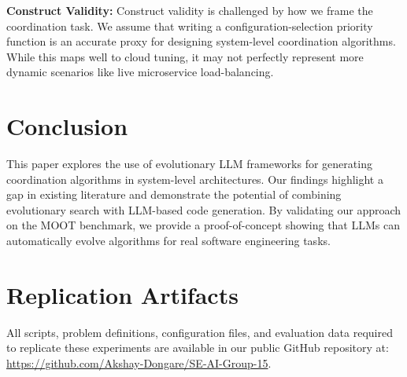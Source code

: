 \documentclass[sigconf,nonacm]{acmart}
\begin{document}
\textbf{Construct Validity:} Construct validity is challenged by how we frame the coordination task. We assume that writing a configuration-selection priority function is an accurate proxy for designing system-level coordination algorithms. While this maps well to cloud tuning, it may not perfectly represent more dynamic scenarios like live microservice load-balancing.

\section{Conclusion}

This paper explores the use of evolutionary LLM frameworks for generating coordination algorithms in system-level architectures. Our findings highlight a gap in existing literature and demonstrate the potential of combining evolutionary search with LLM-based code generation. By validating our approach on the MOOT benchmark, we provide a proof-of-concept showing that LLMs can automatically evolve algorithms for real software engineering tasks.

\section{Replication Artifacts}

All scripts, problem definitions, configuration files, and evaluation data required to replicate these experiments are available in our public GitHub repository at: \url{https://github.com/Akshay-Dongare/SE-AI-Group-15}.



\end{document}
